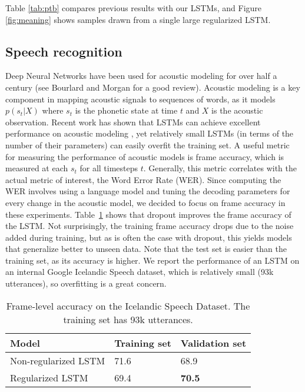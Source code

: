 \documentclass[twoside,11pt,a4paper]{article}
\begin{document}
	Table \ref{tab:ptb} compares previous results with our LSTMs, and
	Figure \ref{fig:meaning} shows samples drawn from a single large 
	regularized LSTM.
	
	
	\subsection{Speech recognition}
	\label{sec:speech}
	
	Deep Neural Networks have been used for acoustic modeling for over half a century (see
	Bourlard and Morgan \cite{BourlardASR} for a good review). Acoustic modeling is a key
	component in mapping acoustic signals to sequences of words, as it
	models $p(s_t|X)$ where $s_t$ is the phonetic state at time $t$ and $X$
	is the acoustic observation. Recent work has shown that LSTMs can 
	achieve excellent performance on acoustic modeling \cite{sak2014speech}, yet
	relatively small LSTMs (in terms of the number of their parameters) can
	easily overfit the training set. A useful metric for measuring the performance of acoustic models is frame
	accuracy, which is measured at each $s_t$ for all timesteps
	$t$. Generally, this metric correlates with the actual metric of
	interest, the Word Error Rate (WER). Since computing the WER
	involves using a language model and tuning the decoding parameters for
	every change in the acoustic model, we decided to focus on frame
	accuracy in these experiments. Table~\ref{tab:speech} shows
	that dropout improves the frame accuracy of the LSTM. Not
	surprisingly, the training frame accuracy drops due to the noise added
	during training, but as is often the case with dropout, this yields
	models that generalize better to unseen data. Note that the test
	set is easier than the training set, as its accuracy is higher.  We
	report the performance of an LSTM on an internal Google Icelandic
	Speech dataset, which is relatively small (93k utterances), so
	overfitting is a great concern.
	
	\begin{table}[t]
		\small
		\centering
		\renewcommand{\arraystretch}{1.15}
		\begin{tabular}{lll}
			\hline
			Model & Training set & Validation set \\
			\hline
			Non-regularized LSTM & 71.6 & 68.9 \\
			Regularized LSTM & 69.4 & {\bf 70.5} \\
			\hline
		\end{tabular}
		\caption{Frame-level accuracy on the Icelandic Speech Dataset. The training set has 93k utterances.}
		\label{tab:speech}
	\end{table}
	
\end{document}
